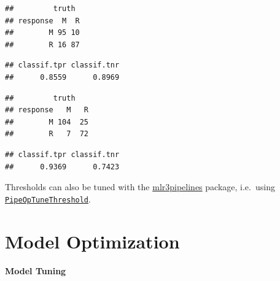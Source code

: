 \documentclass[
]{scrbook}
\newenvironment{Shaded}{\begin{snugshade}}{\end{snugshade}}
\newcommand{\FloatTok}[1]{\textcolor[rgb]{0.00,0.00,0.81}{#1}}
\newcommand{\FunctionTok}[1]{\textcolor[rgb]{0.00,0.00,0.00}{#1}}
\newcommand{\NormalTok}[1]{#1}
\newcommand{\SpecialCharTok}[1]{\textcolor[rgb]{0.00,0.00,0.00}{#1}}
\renewenvironment{Shaded} {\begin{snugshade}\small} {\end{snugshade}}
\begin{document}
\begin{verbatim}
##         truth
## response  M  R
##        M 95 10
##        R 16 87
\end{verbatim}

\begin{Shaded}
\end{Shaded}

\begin{verbatim}
## classif.tpr classif.tnr 
##      0.8559      0.8969
\end{verbatim}

\begin{Shaded}
\end{Shaded}

\begin{verbatim}
##         truth
## response   M   R
##        M 104  25
##        R   7  72
\end{verbatim}

\begin{Shaded}
\end{Shaded}

\begin{verbatim}
## classif.tpr classif.tnr 
##      0.9369      0.7423
\end{verbatim}

Thresholds can also be tuned with the \href{https://mlr3pipelines.mlr-org.com}{mlr3pipelines} package, i.e.~using \href{https://mlr3pipelines.mlr-org.com/reference/mlr_pipeops_tunethreshold.html}{\texttt{PipeOpTuneThreshold}}.

\hypertarget{optimization}{%
\chapter{Model Optimization}\label{optimization}}

\textbf{Model Tuning}
\end{document}

